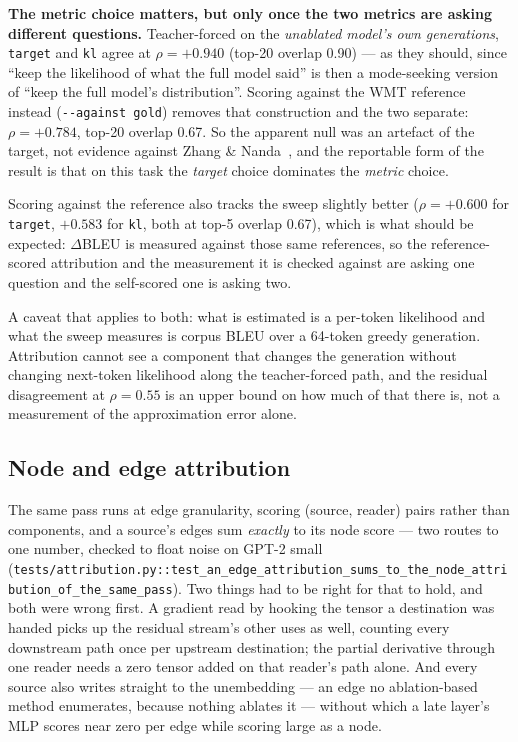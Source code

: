 \documentclass[11pt,a4paper]{article}
\begin{document}
\textbf{The metric choice matters, but only once the two metrics are asking
different questions.} Teacher-forced on the \emph{unablated model's own generations},
\texttt{target} and \texttt{kl} agree at $\rho = +0.940$ (top-20 overlap 0.90) --- as
they should, since ``keep the likelihood of what the full model said'' is then a
mode-seeking version of ``keep the full model's distribution''. Scoring against the
WMT reference instead (\texttt{-{}-against gold}) removes that construction and the
two separate: $\rho = +0.784$, top-20 overlap 0.67. So the apparent null was an
artefact of the target, not evidence against Zhang \& Nanda~\cite{metricchoice}, and
the reportable form of the result is that on this task the \emph{target} choice
dominates the \emph{metric} choice.

Scoring against the reference also tracks the sweep slightly better
($\rho = +0.600$ for \texttt{target}, $+0.583$ for \texttt{kl}, both at top-5 overlap
0.67), which is what should be expected: $\Delta$BLEU is measured against those same
references, so the reference-scored attribution and the measurement it is checked
against are asking one question and the self-scored one is asking two.

A caveat that applies to both: what is estimated is a per-token likelihood and what the
sweep measures is corpus BLEU over a 64-token greedy generation. Attribution cannot see
a component that changes the generation without changing next-token likelihood along the
teacher-forced path, and the residual disagreement at $\rho = 0.55$ is an upper bound on
how much of that there is, not a measurement of the approximation error alone.

\subsection{Node and edge attribution}

The same pass runs at edge granularity, scoring (source, reader) pairs rather than
components, and a source's edges sum \emph{exactly} to its node score --- two routes to
one number, checked to float noise on GPT-2 small
(\texttt{tests/attribution.py::test\_an\_edge\_attribution\_sums\_to\_the\_node\_attribution\_of\_the\_same\_pass}).
Two things had to be right for that to hold, and both were wrong first. A gradient read
by hooking the tensor a destination was handed picks up the residual stream's other uses
as well, counting every downstream path once per upstream destination; the partial
derivative through one reader needs a zero tensor added on that reader's path alone.
And every source also writes straight to the unembedding --- an edge no ablation-based
method enumerates, because nothing ablates it --- without which a late layer's MLP scores
near zero per edge while scoring large as a node.
\end{document}
